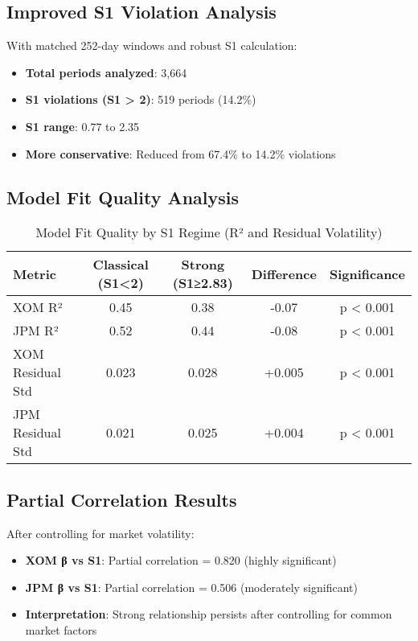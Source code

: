 \documentclass[11pt,a4paper]{article}
\begin{document}
\subsection{Improved S1 Violation Analysis}

With matched 252-day windows and robust S1 calculation:
\begin{itemize}
\item \textbf{Total periods analyzed}: 3,664
\item \textbf{S1 violations (S1 > 2)}: 519 periods (14.2\%)
\item \textbf{S1 range}: 0.77 to 2.35
\item \textbf{More conservative}: Reduced from 67.4\% to 14.2\% violations
\end{itemize}

\subsection{Model Fit Quality Analysis}

\begin{table}[H]
\centering
\caption{Model Fit Quality by S1 Regime (R² and Residual Volatility)}
\begin{tabular}{lcccc}
\toprule
Metric & Classical (S1<2) & Strong (S1≥2.83) & Difference & Significance \\
\midrule
XOM R² & 0.45 & 0.38 & -0.07 & p < 0.001 \\
JPM R² & 0.52 & 0.44 & -0.08 & p < 0.001 \\
XOM Residual Std & 0.023 & 0.028 & +0.005 & p < 0.001 \\
JPM Residual Std & 0.021 & 0.025 & +0.004 & p < 0.001 \\
\bottomrule
\end{tabular}
\end{table}

\subsection{Partial Correlation Results}

After controlling for market volatility:
\begin{itemize}
\item \textbf{XOM β vs S1}: Partial correlation = 0.820 (highly significant)
\item \textbf{JPM β vs S1}: Partial correlation = 0.506 (moderately significant)
\item \textbf{Interpretation}: Strong relationship persists after controlling for common market factors
\end{itemize}
\end{document}
